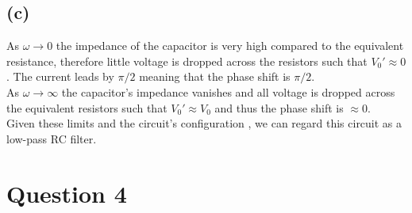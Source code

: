 \documentclass[
	12pt,
	]{article}
\theoremstyle{definition}
\theoremstyle{definition}
\theoremstyle{definition}
\theoremstyle{definition}
\theoremstyle{definition}
\theoremstyle{example}
\theoremstyle{note}
\theoremstyle{remark}
\theoremstyle{example}
\begin{document}
				\subsection*{(c)}
					As $\omega \to 0$ the impedance of the capacitor is very high compared to the equivalent resistance, therefore little voltage is dropped across the resistors such that $V_{0} ' \approx 0$. The current leads by $\pi/2$ meaning that the phase shift is $\pi/2$. \\
					
					\noindent As $\omega \to \infty$ the capacitor's impedance vanishes and all voltage is dropped across the equivalent resistors such that $V_{0}' \approx V_{0}$ and thus the phase shift is $\approx 0$.\\
					
					\noindent Given these limits and the circuit's configuration , we can regard this circuit as a low-pass RC filter.
				\section*{Question 4}
\end{document}
